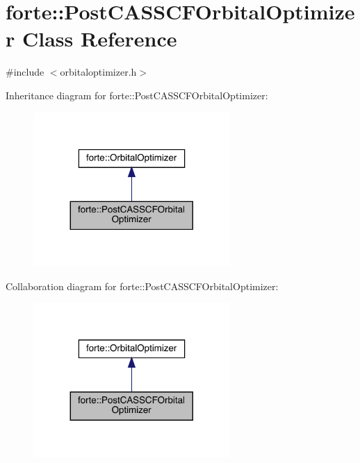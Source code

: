 \hypertarget{classforte_1_1_post_c_a_s_s_c_f_orbital_optimizer}{}\section{forte\+:\+:Post\+C\+A\+S\+S\+C\+F\+Orbital\+Optimizer Class Reference}
\label{classforte_1_1_post_c_a_s_s_c_f_orbital_optimizer}


{\ttfamily \#include $<$orbitaloptimizer.\+h$>$}



Inheritance diagram for forte\+:\+:Post\+C\+A\+S\+S\+C\+F\+Orbital\+Optimizer\+:
\nopagebreak
\begin{figure}[H]
\begin{center}
\leavevmode
\includegraphics[width=212pt]{classforte_1_1_post_c_a_s_s_c_f_orbital_optimizer__inherit__graph}
\end{center}
\end{figure}


Collaboration diagram for forte\+:\+:Post\+C\+A\+S\+S\+C\+F\+Orbital\+Optimizer\+:
\nopagebreak
\begin{figure}[H]
\begin{center}
\leavevmode
\includegraphics[width=212pt]{classforte_1_1_post_c_a_s_s_c_f_orbital_optimizer__coll__graph}
\end{center}
\end{figure}
